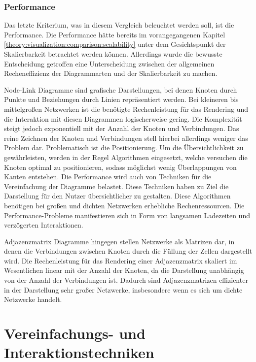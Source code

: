 \subsubsection{Performance}
\label{theory:visualization:comparison:performance}

Das letzte Kriterium, was in diesem Vergleich beleuchtet werden soll, ist die Performance. Die Performance hätte bereits im vorangegangenen Kapitel \ref{theory:visualization:comparison:scalability} unter dem Gesichtspunkt der Skalierbarkeit betrachtet werden können. Allerdings wurde die bewusste Entscheidung getroffen eine Unterscheidung zwischen der allgemeinen Recheneffizienz der Diagrammarten und der Skalierbarkeit zu machen.

Node-Link Diagramme sind grafische Darstellungen, bei denen Knoten durch Punkte und Beziehungen durch Linien repräsentiert werden. Bei kleineren bis mittelgroßen Netzwerken ist die benötigte Rechenleistung für das Rendering und die Interaktion mit diesen Diagrammen logischerweise gering. Die Komplexität steigt jedoch exponentiell mit der Anzahl der Knoten und Verbindungen. Das reine Zeichnen der Knoten und Verbindungen stell hierbei allerdings weniger das Problem dar. Problematisch ist die Positionierung. Um die Übersichtlichkeit zu gewährleisten, werden in der Regel Algorithmen eingesetzt, welche versuchen die Knoten optimal zu positionieren, sodass möglichst wenig Überlappungen von Kanten entstehen. Die Performance wird auch von Techniken für die Vereinfachung der Diagramme belastet. Diese Techniken haben zu Ziel die Darstellung für den Nutzer übersichtlicher zu gestalten.  Diese Algorithmen benötigen bei großen und dichten Netzwerken erhebliche Rechenressourcen. Die Performance-Probleme manifestieren sich in Form von langsamen Ladezeiten und verzögerten Interaktionen.

Adjazenzmatrix Diagramme hingegen stellen Netzwerke als Matrizen dar, in denen die Verbindungen zwischen Knoten durch die Füllung der Zellen dargestellt wird. Die Rechenleistung für das Rendering einer Adjazenzmatrix skaliert im Wesentlichen linear mit der Anzahl der Knoten, da die Darstellung unabhängig von der Anzahl der Verbindungen ist. Dadurch sind Adjazenzmatrizen effizienter in der Darstellung sehr großer Netzwerke, insbesondere wenn es sich um dichte Netzwerke handelt. 

\section{Vereinfachungs- und Interaktionstechniken}

